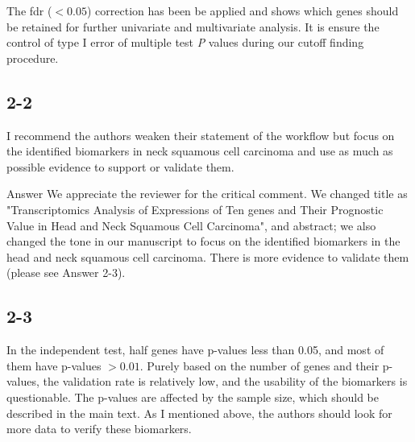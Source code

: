 \documentclass[preprint,12pt]{elsarticle}
\newenvironment{MyColorPar}[1]{%
    \leavevmode\color{#1}\ignorespaces%
}{%
}%
\begin{document}
\begin{MyColorPar}{blue}
\begin{MyColorPar}{red}
The \acrfull{fdr} ($< 0.05$) correction\cite{Benjamini1995a} has been be applied and shows which genes should be retained for further univariate and multivariate analysis.
It is ensure the control of type I error of multiple test \textit{P} values during our cutoff finding procedure.
\end{MyColorPar}


\end{MyColorPar}





%

\subsection*{2-2}
I recommend the authors weaken their statement of the workflow but focus on the identified biomarkers in neck squamous cell carcinoma and use as much as possible evidence to support or validate them. %


%
\begin{MyColorPar}{blue}
Answer
We appreciate the reviewer for the critical comment.
We changed title as "Transcriptomics Analysis of Expressions of Ten genes and Their Prognostic Value in Head and Neck Squamous Cell Carcinoma", and abstract; we also changed the tone in our manuscript to focus on the identified biomarkers in the head and neck squamous cell carcinoma.
There is more evidence to validate them (please see Answer 2-3).

%
\end{MyColorPar}



\subsection*{2-3}

In the independent test, half genes have p-values less than 0.05, and most of them have p-values $> 0.01$. %
Purely based on the number of genes and their p-values, the validation rate is relatively low, and the usability of the biomarkers is questionable. %
The p-values are affected by the sample size, which should be described in the main text. %
As I mentioned above, the authors should look for more data to verify these biomarkers. %
\end{document}
